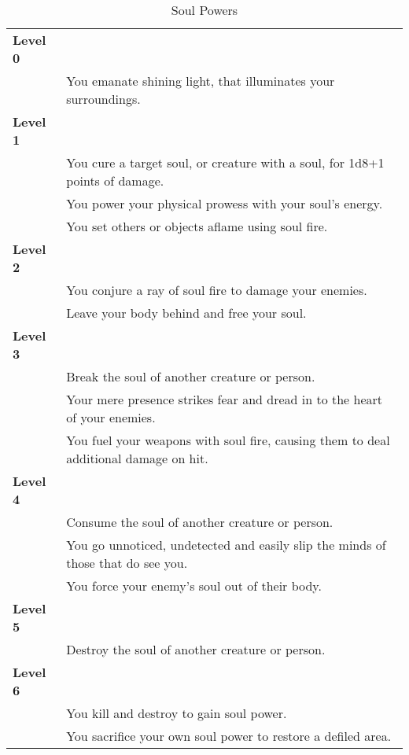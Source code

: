 \begin{table*}[!htb]
  \caption{Soul Powers}
  \begin{tabular}{p{4cm} p{11cm}}
    \textbf{Level 0} & \nobreak \\
    \nameref{soulpower:Shining Aura}     & You emanate shining light, that illuminates your surroundings. \\
    \textbf{Level 1} & \nobreak \\
    \nameref{soulpower:Mend Soul}        & You cure a target soul, or creature with a soul, for 1d8+1 points of damage. \\
    \nameref{soulpower:Fuel of War}      & You power your physical prowess with your soul's energy. \\
    \nameref{soulpower:Aflame}           & You set others or objects aflame using soul fire. \\
    \textbf{Level 2} & \nobreak \\
    \nameref{soulpower:Soul Fire Ray}    & You conjure a ray of soul fire to damage your enemies. \\
    \nameref{soulpower:Disjoint}         & Leave your body behind and free your soul. \\
    \textbf{Level 3} & \nobreak \\
    \nameref{soulpower:Break Soul}       & Break the soul of another creature or person. \\
    \nameref{soulpower:Fearsome Presence}& Your mere presence strikes fear and dread in to the heart of your enemies. \\
    \nameref{soulpower:Soul Blade}       & You fuel your weapons with soul fire, causing them to deal additional damage on hit. \\
    \textbf{Level 4} & \nobreak \\
    \nameref{soulpower:Consume Soul}     & Consume the soul of another creature or person. \\
    \nameref{soulpower:Inconspicuous Presence} & You go unnoticed, undetected and easily slip the minds of those that do see you. \\
    \nameref{soulpower:Violent Disjoint} & You force your enemy's soul out of their body. \\
    \textbf{Level 5} & \nobreak \\
    \nameref{soulpower:Annihilate}       & Destroy the soul of another creature or person. \\
    \textbf{Level 6} & \nobreak \\
    \nameref{soulpower:Defile}           & You kill and destroy to gain soul power. \\
    \nameref{soulpower:Preserve}         & You sacrifice your own soul power to restore a defiled area. \\
  \end{tabular}
\end{table*}

